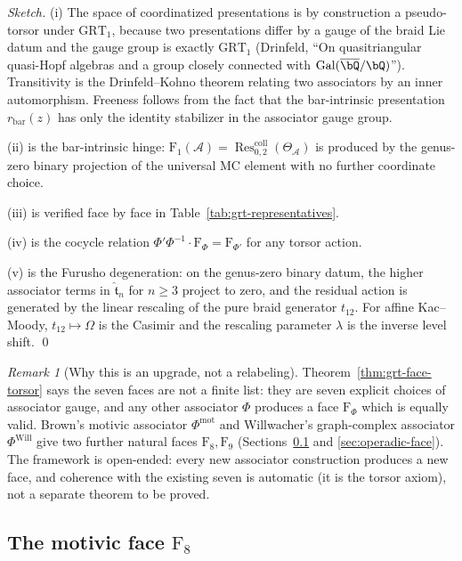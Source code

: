 \documentclass[11pt]{article}
\theoremstyle{plain}
\theoremstyle{definition}
\theoremstyle{remark}
\newtheorem{remark}[theorem]{Remark}
\newcommand{\cA}{\mathcal{A}}
\newcommand{\Res}{\operatorname{Res}}
\begin{document}
\begin{proof}[Sketch]
(i) The space of coordinatized presentations is by construction a
pseudo-torsor under $\mathrm{GRT}_1$, because two presentations
differ by a gauge of the braid Lie datum and the gauge group is
exactly $\mathrm{GRT}_1$ (Drinfeld, ``On quasitriangular
quasi-Hopf algebras and a group closely connected with
$\mathrm{Gal}(\overline{\bQ}/\bQ)$''). Transitivity is the
Drinfeld--Kohno theorem relating two associators by an inner
automorphism. Freeness follows from the fact that the bar-intrinsic
presentation $r_{\mathrm{bar}}(z)$ has only the identity stabilizer
in the associator gauge group.

(ii) is the bar-intrinsic hinge:
$\mathrm{F}_1(\cA) = \Res^{\mathrm{coll}}_{0,2}(\Theta_\cA)$ is
produced by the genus-zero binary projection of the universal MC
element with no further coordinate choice.

(iii) is verified face by face in
Table~\ref{tab:grt-representatives}.

(iv) is the cocycle relation
$\Phi'\Phi^{-1}\cdot\mathrm{F}_\Phi = \mathrm{F}_{\Phi'}$ for any
torsor action.

(v) is the Furusho degeneration: on the genus-zero binary datum,
the higher associator terms in $\widehat{\mathfrak{t}}_n$ for
$n\geq 3$ project to zero, and the residual action is generated by
the linear rescaling of the pure braid generator $t_{12}$. For
affine Kac--Moody, $t_{12}\mapsto \Omega$ is the Casimir and the
rescaling parameter $\lambda$ is the inverse level shift. \qed
\end{proof}

\begin{remark}[Why this is an upgrade, not a relabeling]
Theorem~\ref{thm:grt-face-torsor} says the seven faces are not a
finite list: they are seven explicit choices of associator gauge,
and any other associator $\Phi$ produces a face
$\mathrm{F}_\Phi$ which is equally valid. Brown's motivic associator
$\Phi^{\mathrm{mot}}$ and Willwacher's graph-complex associator
$\Phi^{\mathrm{Will}}$ give two further natural faces
$\mathrm{F}_8,\mathrm{F}_9$ (Sections~\ref{sec:motivic-face} and
\ref{sec:operadic-face}). The framework is open-ended: every new
associator construction produces a new face, and coherence with the
existing seven is automatic (it is the torsor axiom), not a
separate theorem to be proved.
\end{remark}

\subsection{The motivic face $\mathrm{F}_8$}\label{sec:motivic-face}
\end{document}
